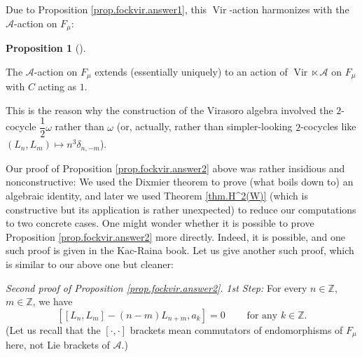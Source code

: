 \documentclass
[numbers=enddot,12pt,final,onecolumn,german,notitlepage]{scrartcl}%
\theoremstyle{definition}
\newtheorem{prop}[theo]{Proposition}
\newenvironment{proposition}[1][]
{\begin{prop}[#1]\begin{leftbar}}
{\end{leftbar}\end{prop}}
\begin{document}
Due to Proposition \ref{prop.fockvir.answer1}, this $\operatorname*{Vir}%
$-action harmonizes with the $\mathcal{A}$-action on $F_{\mu}$:

\begin{proposition}
The $\mathcal{A}$-action on $F_{\mu}$ extends (essentially uniquely) to an
action of $\operatorname*{Vir}\ltimes\mathcal{A}$ on $F_{\mu}$ with $C$ acting
as $1$.
\end{proposition}

This is the reason why the construction of the Virasoro algebra involved the
$2$-cocycle $\dfrac{1}{2}\omega$ rather than $\omega$ (or, actually, rather
than simpler-looking $2$-cocycles like $\left(  L_{n},L_{m}\right)  \mapsto
n^{3}\delta_{n,-m}$).

Our proof of Proposition \ref{prop.fockvir.answer2} above was rather insidious
and nonconstructive: We used the Dixmier theorem to prove (what boils down to)
an algebraic identity, and later we used Theorem \ref{thm.H^2(W)} (which is
constructive but its application is rather unexpected) to reduce our
computations to two concrete cases. One might wonder whether it is possible to
prove Proposition \ref{prop.fockvir.answer2} more directly. Indeed, it is
possible, and one such proof is given in the Kac-Raina book. Let us give
another such proof, which is similar to our above one but cleaner:

\textit{Second proof of Proposition \ref{prop.fockvir.answer2}.} \textit{1st
Step:} For every $n\in\mathbb{Z}$, $m\in\mathbb{Z}$, we have%
\begin{equation}
\left[  \left[  L_{n},L_{m}\right]  -\left(  n-m\right)  L_{n+m},a_{k}\right]
=0\ \ \ \ \ \ \ \ \ \ \text{for any }k\in\mathbb{Z}.
\label{pf.fockvir.answer2.pf.1}%
\end{equation}
(Let us recall that the $\left[  \cdot,\cdot\right]  $ brackets mean
commutators of endomorphisms of $F_{\mu}$ here, not Lie brackets of
$\mathcal{A}$.)
\end{document}
